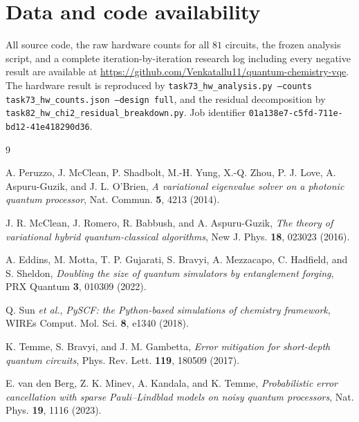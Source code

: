 \documentclass[aps,prx,twocolumn,superscriptaddress,nofootinbib,floatfix]{revtex4-2}
\begin{document}
\section*{Data and code availability}

All source code, the raw hardware counts for all $81$ circuits, the frozen
analysis script, and a complete iteration-by-iteration research log
including every negative result are available at
\url{https://github.com/Venkatallu11/quantum-chemistry-vqe}. The hardware
result is reproduced by
\texttt{task73\_hw\_analysis.py --counts task73\_hw\_counts.json
--design full}, and the residual decomposition by
\texttt{task82\_hw\_chi2\_residual\_breakdown.py}. Job identifier
\texttt{01a138e7-c5fd-711e-bd12-41e418290d36}.

\begin{thebibliography}{9}

 A. Peruzzo, J. McClean, P. Shadbolt, M.-H. Yung,
X.-Q. Zhou, P. J. Love, A. Aspuru-Guzik, and J. L. O'Brien,
\emph{A variational eigenvalue solver on a photonic quantum processor},
Nat. Commun. \textbf{5}, 4213 (2014).

 J. R. McClean, J. Romero, R. Babbush, and
A. Aspuru-Guzik, \emph{The theory of variational hybrid
quantum-classical algorithms}, New J. Phys. \textbf{18}, 023023 (2016).

 A. Eddins, M. Motta, T. P. Gujarati, S. Bravyi,
A. Mezzacapo, C. Hadfield, and S. Sheldon, \emph{Doubling the size of
quantum simulators by entanglement forging}, PRX Quantum \textbf{3},
010309 (2022).

 Q. Sun \emph{et al.}, \emph{PySCF: the Python-based
simulations of chemistry framework}, WIREs Comput. Mol. Sci. \textbf{8},
e1340 (2018).

 K. Temme, S. Bravyi, and J. M. Gambetta,
\emph{Error mitigation for short-depth quantum circuits},
Phys. Rev. Lett. \textbf{119}, 180509 (2017).

 E. van den Berg, Z. K. Minev, A. Kandala, and
K. Temme, \emph{Probabilistic error cancellation with sparse
Pauli--Lindblad models on noisy quantum processors},
Nat. Phys. \textbf{19}, 1116 (2023).

\end{thebibliography}
\end{document}
